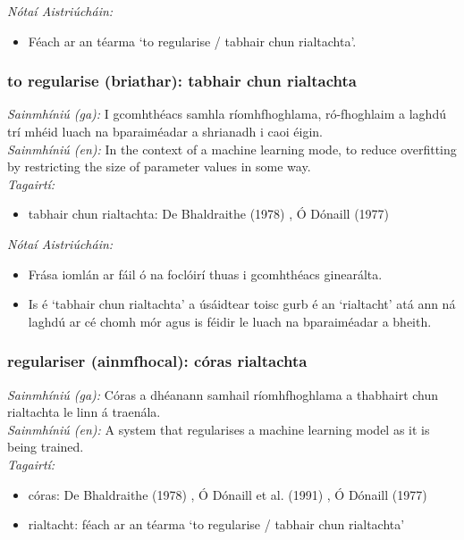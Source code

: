  \noindent \textit{Nótaí Aistriúcháin:}
\begin{itemize}
	\item Féach ar an téarma `to regularise / tabhair chun rialtachta'.
\end{itemize}


\subsubsection*{to regularise (briathar): tabhair chun rialtachta}
 \noindent \textit{Sainmhíniú (ga):} I gcomhthéacs samhla ríomhfhoghlama, ró-fhoghlaim a laghdú trí mhéid luach na bparaiméadar a shrianadh i caoi éigin.
\\
 \noindent \textit{Sainmhíniú (en):} In the context of a machine learning mode, to reduce overfitting by restricting the size of parameter values in some way.
\\
 \noindent \textit{Tagairtí:}
\begin{itemize}
	\item tabhair chun rialtachta: De Bhaldraithe (1978) \cite{de-bhaldraithe}, Ó Dónaill (1977) \cite{odonaill}
\end{itemize}

 \noindent \textit{Nótaí Aistriúcháin:}
\begin{itemize}
	\item Frása iomlán ar fáil ó na foclóirí thuas i gcomhthéacs ginearálta.
	\item Is é `tabhair chun rialtachta' a úsáidtear toisc gurb é an `rialtacht' atá ann ná laghdú ar cé chomh mór agus is féidir le luach na bparaiméadar a bheith.
\end{itemize}


\subsubsection*{regulariser (ainmfhocal): córas rialtachta}
 \noindent \textit{Sainmhíniú (ga):} Córas a dhéanann samhail ríomhfhoghlama a thabhairt chun rialtachta le linn á traenála.
\\
 \noindent \textit{Sainmhíniú (en):} A system that regularises a machine learning model as it is being trained.
\\
 \noindent \textit{Tagairtí:}
\begin{itemize}
	\item córas: De Bhaldraithe (1978) \cite{de-bhaldraithe}, Ó Dónaill et al. (1991) \cite{focloir-beag}, Ó Dónaill (1977) \cite{odonaill}
	\item rialtacht: féach ar an téarma `to regularise / tabhair chun rialtachta'
\end{itemize}

